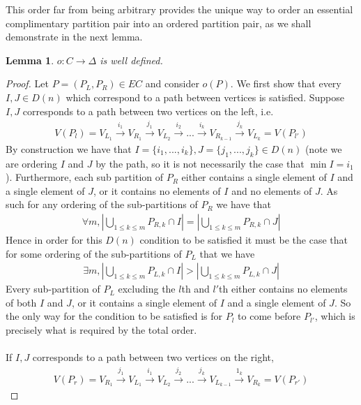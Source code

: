 \documentclass[11pt]{amsart}
\newtheorem{lemma}[thm]{Lemma}
\theoremstyle{definition}
\theoremstyle{remark}
\numberwithin{equation}{section}
\newcommand{\EC}{C}
\newcommand{\OP}{\Delta}
\newcommand{\0}{\color{blue}{\mathsf{0}}}
\begin{document}
This order far from being arbitrary provides the unique way to order an essential complimentary partition pair into an ordered partition pair, as we shall demonstrate in the next lemma.
\begin{lemma} \label{o well defined}
$o:\EC \to \OP$ is well defined.
\end{lemma}
\begin{proof}
Let $P=(P_L,P_R) \in EC$ and consider $o(P)$. We first show that every $I,J \in D(n)$ which correspond to a path between vertices is satisfied. Suppose $I,J$ corresponds to a path between two vertices on the left, i.e.
\begin{align*}
    V(P_l) = V_{L_1} \xrightarrow{i_1} V_{R_1}\xrightarrow{j_1} V_{L_2} \xrightarrow{i_2}... \xrightarrow{i_{k}} V_{R_{k-1}} \xrightarrow{j_k} V_{L_k}=V(P_{l'})
\end{align*}
By construction we have that $I = \{i_1,...,i_k\},J=\{j_1,...,j_k\} \in D(n)$ (note we are ordering $I$ and $J$ by the path, so it is not necessarily the case that $\min I = i_1$). Furthermore, each sub partition of $P_R$ either contains a single element of $I$ and a single element of $J$, or it contains no elements of $I$ and no elements of $J$. As such for any ordering of the sub-partitions of $P_R$ we have that 
\begin{align*}
    \forall m, |\bigcup_{1\leq k \leq m} P_{R,k} \cap I| = |\bigcup_{1\leq k \leq m} P_{R,k} \cap J|
\end{align*}
Hence in order for this $D(n)$ condition to be satisfied it must be the case that for some ordering of the sub-partitions of $P_L$ that we have
\begin{align*}
    \exists m, |\bigcup_{1\leq k \leq m} P_{L,k} \cap I| > |\bigcup_{1\leq k \leq m} P_{L,k} \cap J|
\end{align*}
Every sub-partition of $P_L$ excluding the $l$th and $l'$th either contains no elements of both $I$ and $J$, or it contains a single element of $I$ and a single element of $J$. So the only way for the condition to be satisfied is for $P_l$ to come before $P_{l'}$, which is precisely what is required by the total order.
\\\\
If $I,J$ corresponds to a path between two vertices on the right,
\begin{align*}
    V(P_r) = V_{R_1} \xrightarrow{j_1} V_{L_1}\xrightarrow{i_1} V_{L_2} \xrightarrow{j_2}... \xrightarrow{j_{k}} V_{L_{k-1}} \xrightarrow{1_k} V_{R_k}=V(P_{r'})
\end{align*}

\end{proof}
\end{document}
